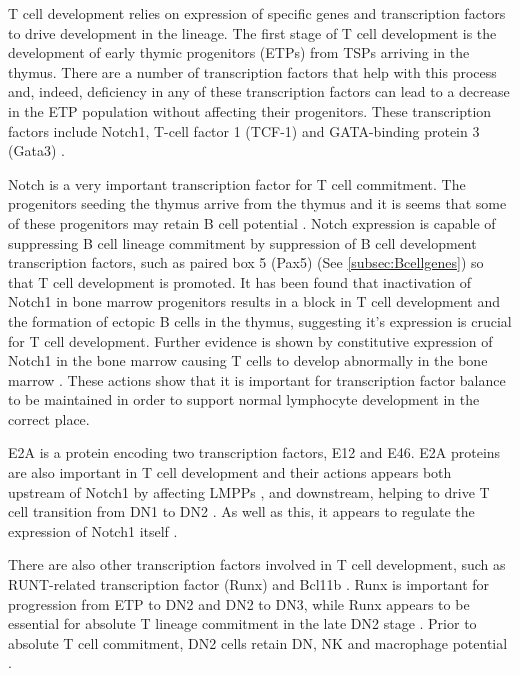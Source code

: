 T cell development relies on expression of specific genes and transcription factors to drive development in the lineage.
The first stage of T cell development is the development of early thymic progenitors (ETPs) from TSPs arriving in the thymus.
There are a number of transcription factors that help with this process and, indeed, deficiency in any of these transcription factors can lead to a decrease in the ETP population without affecting their progenitors.
These transcription factors include Notch1, T-cell factor 1 (TCF-1) and GATA-binding protein 3 (Gata3) \citep{Sambandam2005, Naito2011, Weber2011, Hosoya2009}.

Notch is a very important transcription factor for T cell commitment.
The progenitors seeding the thymus arrive from the thymus and it is seems that some of these progenitors may retain B cell potential \citep{Porritt2004}.
Notch expression is capable of suppressing B cell lineage commitment by suppression of B cell development transcription factors, such as paired box 5 (Pax5) (See \cref{subsec:Bcellgenes}) so that T cell development is promoted.
It has been found that inactivation of Notch1 in bone marrow progenitors results in a block in T cell development and the formation of ectopic B cells in the thymus, suggesting it's expression is crucial for T cell development.
Further evidence is shown by constitutive expression of Notch1 in the bone marrow causing T cells to develop abnormally in the bone marrow \citep{Radtke2013}.
These actions show that it is important for transcription factor balance to be maintained in order to support normal lymphocyte development in the correct place.

E2A is a protein encoding two transcription factors, E12 and E46.
E2A proteins are also important in T cell development and their actions appears both upstream of Notch1 by affecting LMPPs \citep{Dias2008}, and downstream, helping to drive T cell transition from DN1 to DN2 \citep{Naito2011}.
As well as this, it appears to regulate the expression of Notch1 itself \citep{Dias2008}.

There are also other transcription factors involved in T cell development, such as RUNT-related transcription factor (Runx) and Bcl11b \citep{Naito2011, Liu2010}.
Runx is important for progression from ETP to DN2 and DN2 to DN3, while Runx appears to be essential for absolute T lineage commitment in the late DN2 stage \citep{Liu2010, Naito2011}. 
Prior to absolute T cell commitment, DN2 cells retain DN, NK and macrophage potential \citep{Naito2011}.


